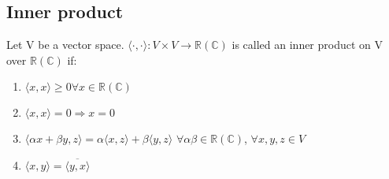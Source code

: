 \documentclass[a4paper, 12pt]{article}
\begin{document}
\subsection{Inner product}

\begin{mydef}
	Let V be a vector space. $\langle\cdot,\cdot\rangle: V \times V \rightarrow \mathbb{R}(\mathbb{C})$ is called an inner product on V over $\mathbb{R}(\mathbb{C})$ if:
	\begin{enumerate}[label=(\roman*)]
		\item $\langle x, x \rangle \geq 0 $\:$\forall x \in \mathbb{R}(\mathbb{C})$
		\item $\langle x, x \rangle = 0 \Rightarrow x=0$
		\item $\langle \alpha x + \beta y, z \rangle = \alpha \langle x, z \rangle + \beta \langle y,z \rangle$ \: $\forall \alpha \beta \in \mathbb{R}(\mathbb{C})$, \: $\forall x,y,z \in V $
		\item $\langle x,y\rangle = \overline{\langle y,x \rangle}$
	\end{enumerate}
\end{mydef}
\end{document}
